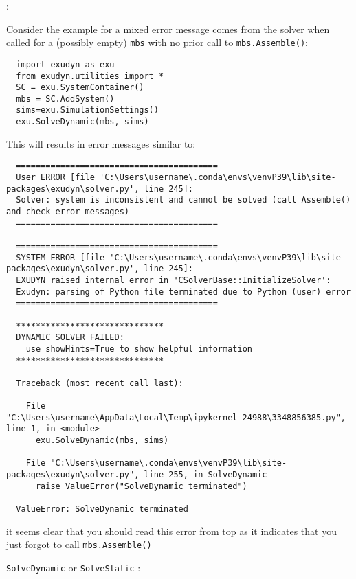 \noindent {}:
\bi
\item Consider the  example for a mixed error message comes from the solver when called for a (possibly empty) \texttt{mbs} with no prior call to \texttt{mbs.Assemble()}:
\plainlststyle
\begin{lstlisting}
  import exudyn as exu
  from exudyn.utilities import *
  SC = exu.SystemContainer()
  mbs = SC.AddSystem()
  sims=exu.SimulationSettings()
  exu.SolveDynamic(mbs, sims)
\end{lstlisting}
\item This will results in error messages similar to:
\begin{lstlisting}
  =========================================
  User ERROR [file 'C:\Users\username\.conda\envs\venvP39\lib\site-packages\exudyn\solver.py', line 245]: 
  Solver: system is inconsistent and cannot be solved (call Assemble() and check error messages)
  =========================================

  =========================================
  SYSTEM ERROR [file 'C:\Users\username\.conda\envs\venvP39\lib\site-packages\exudyn\solver.py', line 245]: 
  EXUDYN raised internal error in 'CSolverBase::InitializeSolver':
  Exudyn: parsing of Python file terminated due to Python (user) error
  =========================================

  ******************************
  DYNAMIC SOLVER FAILED:
    use showHints=True to show helpful information
  ******************************
   
  Traceback (most recent call last):

    File "C:\Users\username\AppData\Local\Temp\ipykernel_24988\3348856385.py", line 1, in <module>
      exu.SolveDynamic(mbs, sims)

    File "C:\Users\username\.conda\envs\venvP39\lib\site-packages\exudyn\solver.py", line 255, in SolveDynamic
      raise ValueError("SolveDynamic terminated")

  ValueError: SolveDynamic terminated
\end{lstlisting}
\onlyRST{\rstStartNewLine}
\bi
\item[$\ra$] it seems clear that you should read this error from top as it indicates that you just forgot to call \texttt{mbs.Assemble()}
\ei
\item \texttt{SolveDynamic} or \texttt{SolveStatic} :
